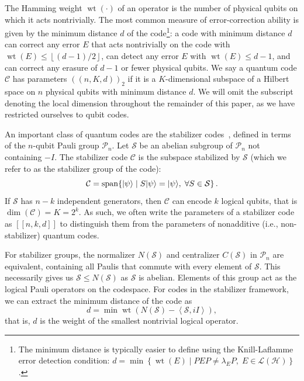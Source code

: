 \documentclass[]{amsart}
\DeclarePairedDelimiter\ket{\lvert}{\rangle}
\DeclareMathOperator{\wt}{wt}
\DeclareMathOperator{\Span}{span}
\begin{document}
The Hamming weight $\wt\!\left(\cdot\right)$ of an operator is the number of physical qubits on which it acts nontrivially.
The most common measure of error-correction ability is given by the minimum distance $d$ of the code\footnote{The minimum distance is typically easier to define using the Knill-Laflamme error detection condition: $d=\min\!\left\{\wt\!\left(E\right)\mid PEP\neq\lambda_E P,\;E\in\mathcal{L}\!\left(\mathcal{H}\right)\right\}$.}: a code with minimum distance $d$ can correct any error $E$ that acts nontrivially on the code with $\wt\!\left(E\right)\leq \left\lfloor\left(d-1\right)/2\right\rfloor$, can detect any error $E$ with $\wt\!\left(E\right)\leq d-1$, and can correct any erasure of $d-1$ or fewer physical qubits.
We say a quantum code $\mathcal{C}$ has parameters $\left(\!\left(n,K,d\right)\!\right)_2$ if it is a $K$-dimensional subspace of a Hilbert space on $n$ physical qubits with minimum distance $d$.
We will omit the subscript denoting the local dimension throughout the remainder of this paper, as we have restricted ourselves to qubit codes.

An important class of quantum codes are the stabilizer codes~\cite{Got1997,CRSS1998}, defined in terms of the $n$-qubit Pauli group $\mathcal{P}_n$.
Let $\mathcal{S}$ be an abelian subgroup of $\mathcal{P}_n$ not containing $-I$.
The stabilizer code $\mathcal{C}$ is the subspace stabilized by $\mathcal{S}$ (which we refer to as the stabilizer group of the code):
\begin{equation}
    \mathcal{C}=\Span\!\left\{\ket{\psi}\mid S\ket{\psi}=\ket{\psi},\;\forall S\in\mathcal{S}\right\}.
\end{equation}
If $\mathcal{S}$ has $n-k$ independent generators, then $\mathcal{C}$ can encode $k$ logical qubits, that is $\dim\!\left(\mathcal{C}\right)=K=2^k$.
As such, we often write the parameters of a stabilizer code as $\left[\!\left[n,k,d\right]\!\right]$ to distinguish them from the parameters of nonadditive (i.e., non-stabilizer) quantum codes.

For stabilizer groups, the normalizer $N\!\left(\mathcal{S}\right)$ and centralizer $C\!\left(\mathcal{S}\right)$ in $\mathcal{P}_n$ are equivalent, containing all Paulis that commute with every element of $\mathcal{S}$.
This necessarily gives us $\mathcal{S}\leq N\!\left(\mathcal{S}\right)$ as $\mathcal{S}$ is abelian.
Elements of this group act as the logical Pauli operators on the codespace.
For codes in the stabilizer framework, we can extract the minimum distance of the code as
\begin{equation}
    d=\min\wt\!\left(N\!\left(\mathcal{S}\right)-\left\langle \mathcal{S},iI\right\rangle\right),
\end{equation}
that is, $d$ is the weight of the smallest nontrivial logical operator.
\end{document}
